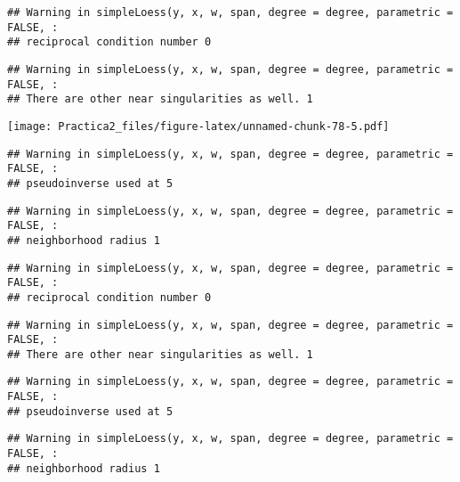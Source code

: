 \documentclass[
]{article}
\newenvironment{Shaded}{\begin{snugshade}}{\end{snugshade}}
\newcommand{\FunctionTok}[1]{\textcolor[rgb]{0.00,0.00,0.00}{#1}}
\newcommand{\NormalTok}[1]{#1}
\newcommand{\SpecialCharTok}[1]{\textcolor[rgb]{0.00,0.00,0.00}{#1}}
\begin{document}
\begin{verbatim}
## Warning in simpleLoess(y, x, w, span, degree = degree, parametric = FALSE, :
## reciprocal condition number 0
\end{verbatim}

\begin{verbatim}
## Warning in simpleLoess(y, x, w, span, degree = degree, parametric = FALSE, :
## There are other near singularities as well. 1
\end{verbatim}

\texttt{[image: Practica2\_files/figure-latex/unnamed-chunk-78-5.pdf]}

\begin{Shaded}
\end{Shaded}

\begin{verbatim}
## Warning in simpleLoess(y, x, w, span, degree = degree, parametric = FALSE, :
## pseudoinverse used at 5
\end{verbatim}

\begin{verbatim}
## Warning in simpleLoess(y, x, w, span, degree = degree, parametric = FALSE, :
## neighborhood radius 1
\end{verbatim}

\begin{verbatim}
## Warning in simpleLoess(y, x, w, span, degree = degree, parametric = FALSE, :
## reciprocal condition number 0
\end{verbatim}

\begin{verbatim}
## Warning in simpleLoess(y, x, w, span, degree = degree, parametric = FALSE, :
## There are other near singularities as well. 1
\end{verbatim}

\begin{verbatim}
## Warning in simpleLoess(y, x, w, span, degree = degree, parametric = FALSE, :
## pseudoinverse used at 5
\end{verbatim}

\begin{verbatim}
## Warning in simpleLoess(y, x, w, span, degree = degree, parametric = FALSE, :
## neighborhood radius 1
\end{verbatim}
\end{document}

